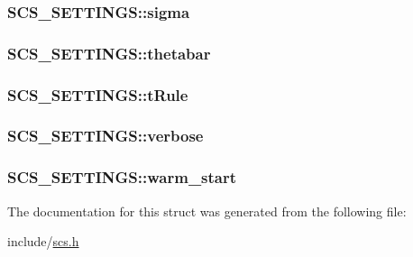 \hypertarget{struct_s_c_s___s_e_t_t_i_n_g_s_a7b45173215e15ea5936fdf9f268e5881}{
\subsubsection[{sigma}]{ S\-C\-S\-\_\-\-S\-E\-T\-T\-I\-N\-G\-S\-::sigma}}\label{struct_s_c_s___s_e_t_t_i_n_g_s_a7b45173215e15ea5936fdf9f268e5881}
\hypertarget{struct_s_c_s___s_e_t_t_i_n_g_s_a2ce39340133d9b8efac35b67432e1141}{
\subsubsection[{thetabar}]{ S\-C\-S\-\_\-\-S\-E\-T\-T\-I\-N\-G\-S\-::thetabar}}\label{struct_s_c_s___s_e_t_t_i_n_g_s_a2ce39340133d9b8efac35b67432e1141}
\hypertarget{struct_s_c_s___s_e_t_t_i_n_g_s_a3dc42bc0693d4e530b4d756299b118df}{
\subsubsection[{t\-Rule}]{ S\-C\-S\-\_\-\-S\-E\-T\-T\-I\-N\-G\-S\-::t\-Rule}}\label{struct_s_c_s___s_e_t_t_i_n_g_s_a3dc42bc0693d4e530b4d756299b118df}
\hypertarget{struct_s_c_s___s_e_t_t_i_n_g_s_a6f332a476fcf237bfc3ebc99124a24ae}{
\subsubsection[{verbose}]{ S\-C\-S\-\_\-\-S\-E\-T\-T\-I\-N\-G\-S\-::verbose}}\label{struct_s_c_s___s_e_t_t_i_n_g_s_a6f332a476fcf237bfc3ebc99124a24ae}
\hypertarget{struct_s_c_s___s_e_t_t_i_n_g_s_a38a4b68bc0363f4dd0737ae5621388ae}{
\subsubsection[{warm\-\_\-start}]{ S\-C\-S\-\_\-\-S\-E\-T\-T\-I\-N\-G\-S\-::warm\-\_\-start}}\label{struct_s_c_s___s_e_t_t_i_n_g_s_a38a4b68bc0363f4dd0737ae5621388ae}


The documentation for this struct was generated from the following file\-:\begin{DoxyCompactItemize}
\item 
include/\hyperlink{scs_8h}{scs.\-h}\end{DoxyCompactItemize}

